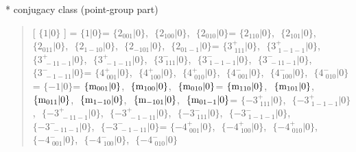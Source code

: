 \documentclass[fleqn,10pt,landscape]{jsarticle}
\begin{document}
* conjugacy class (point-group part)
\begin{quote}
[ $\{1|0\}$ ] = \quad $\{1|0\}$\newline[ $\{2{}_{001}|0\}$ ] = \quad $\{2{}_{001}|0\}$,\,\, $\{2{}_{100}|0\}$,\,\, $\{2{}_{010}|0\}$\newline[ $\{2{}_{110}|0\}$ ] = \quad $\{2{}_{110}|0\}$,\,\, $\{2{}_{101}|0\}$,\,\, $\{2{}_{011}|0\}$,\,\, $\{2{}_{1-10}|0\}$,\,\, $\{2{}_{-101}|0\}$,\,\, $\{2{}_{01-1}|0\}$\newline[ $\{3^{+}_{\,\,111}|0\}$ ] = \quad $\{3^{+}_{\,\,111}|0\}$,\,\, $\{3^{+}_{\,\,1-1-1}|0\}$,\,\, $\{3^{+}_{\,\,-11-1}|0\}$,\,\, $\{3^{+}_{\,\,-1-11}|0\}$,\,\, $\{3^{-}_{\,\,111}|0\}$,\,\, $\{3^{-}_{\,\,1-1-1}|0\}$,\,\, $\{3^{-}_{\,\,-11-1}|0\}$,\,\, $\{3^{-}_{\,\,-1-11}|0\}$\newline[ $\{4^{+}_{\,\,001}|0\}$ ] = \quad $\{4^{+}_{\,\,001}|0\}$,\,\, $\{4^{+}_{\,\,100}|0\}$,\,\, $\{4^{+}_{\,\,010}|0\}$,\,\, $\{4^{-}_{\,\,001}|0\}$,\,\, $\{4^{-}_{\,\,100}|0\}$,\,\, $\{4^{-}_{\,\,010}|0\}$\newline[ $\{-1|0\}$ ] = \quad $\{-1|0\}$\newline[ $\{{\rm m}_{001}|0\}$ ] = \quad $\{{\rm m}_{001}|0\}$,\,\, $\{{\rm m}_{100}|0\}$,\,\, $\{{\rm m}_{010}|0\}$\newline[ $\{{\rm m}_{110}|0\}$ ] = \quad $\{{\rm m}_{110}|0\}$,\,\, $\{{\rm m}_{101}|0\}$,\,\, $\{{\rm m}_{011}|0\}$,\,\, $\{{\rm m}_{1-10}|0\}$,\,\, $\{{\rm m}_{-101}|0\}$,\,\, $\{{\rm m}_{01-1}|0\}$\newline[ $\{-3^{+}_{\,\,111}|0\}$ ] = \quad $\{-3^{+}_{\,\,111}|0\}$,\,\, $\{-3^{+}_{\,\,1-1-1}|0\}$,\,\, $\{-3^{+}_{\,\,-11-1}|0\}$,\,\, $\{-3^{+}_{\,\,-1-11}|0\}$,\,\, $\{-3^{-}_{\,\,111}|0\}$,\,\, $\{-3^{-}_{\,\,1-1-1}|0\}$,\,\, $\{-3^{-}_{\,\,-11-1}|0\}$,\,\, $\{-3^{-}_{\,\,-1-11}|0\}$\newline[ $\{-4^{+}_{\,\,001}|0\}$ ] = \quad $\{-4^{+}_{\,\,001}|0\}$,\,\, $\{-4^{+}_{\,\,100}|0\}$,\,\, $\{-4^{+}_{\,\,010}|0\}$,\,\, $\{-4^{-}_{\,\,001}|0\}$,\,\, $\{-4^{-}_{\,\,100}|0\}$,\,\, $\{-4^{-}_{\,\,010}|0\}$\newline
\end{quote}
\end{document}
